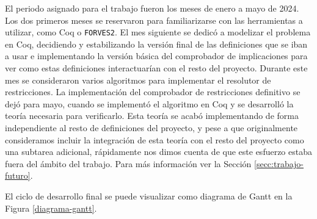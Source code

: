 El periodo asignado para el trabajo fueron los meses de enero a mayo de 2024. Los dos primeros
meses se reservaron para familiarizarse con las herramientas a utilizar, como Coq o \verb|FORVES2|.
El mes siguiente se dedicó a modelizar el problema en Coq, decidiendo y estabilizando la versión
final de las definiciones que se iban a usar e implementando la versión básica del comprobador de
implicaciones para ver como estas definiciones interactuarían con el resto del proyecto. Durante
este mes se consideraron varios algoritmos para implementar el resolutor de restricciones. La
implementación del comprobador de restricciones definitivo se dejó para mayo, cuando se implementó
el algoritmo en Coq y se desarrolló la teoría necesaria para verificarlo. Esta teoría se acabó
implementando de forma independiente al resto de definiciones del proyecto, y pese a que 
originalmente consideramos incluir la integración de esta teoría con el resto del proyecto como 
una subtarea adicional, rápidamente nos dimos cuenta de que este esfuerzo estaba fuera del ámbito
del trabajo. Para más información ver la Sección \ref{secc:trabajo-futuro}.

El ciclo de desarrollo final se puede visualizar como diagrama de Gantt en la Figura \ref{diagrama-gantt}.

